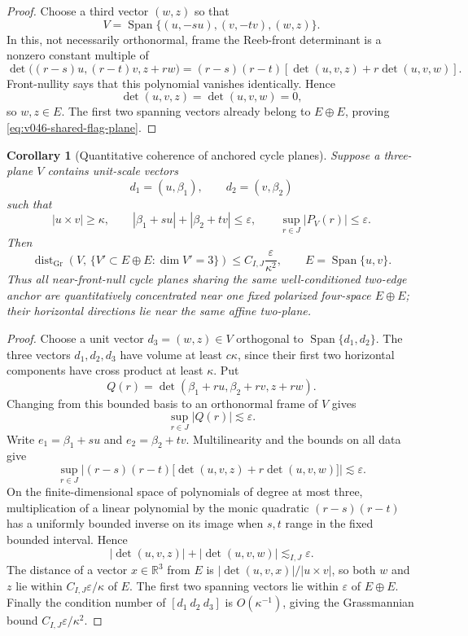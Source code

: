 \documentclass[10pt]{article}
\newtheorem{corollary}[theorem]{Corollary}
\newcommand{\R}{\mathbb R}
\newcommand{\Span}{\operatorname{Span}}
\begin{document}
\begin{proof}
Choose a third vector \((w,z)\) so that
\[
V=\Span\{(u,-su),(v,-tv),(w,z)\}.
\]
In this, not necessarily orthonormal, frame the Reeb-front determinant is a nonzero constant
multiple of
\[
\det\bigl((r-s)u,(r-t)v,z+rw\bigr)
=
(r-s)(r-t)
\left[
\det(u,v,z)+r\det(u,v,w)
\right].
\]
Front-nullity says that this polynomial vanishes identically.  Hence
\[
\det(u,v,z)=\det(u,v,w)=0,
\]
so \(w,z\in E\).  The first two spanning vectors already belong to \(E\oplus E\), proving
\eqref{eq:v046-shared-flag-plane}.
\end{proof}

\begin{corollary}[Quantitative coherence of anchored cycle planes]
\label{cor:v046-anchored-plane-coherence}
Suppose a three-plane \(V\) contains unit-scale vectors
\[
d_1=(u,\beta_1),
\qquad
d_2=(v,\beta_2)
\]
such that
\[
|u\times v|\ge\kappa,
\qquad
|\beta_1+su|+|\beta_2+tv|\le\varepsilon,
\qquad
\sup_{r\in J}|P_V(r)|\le\varepsilon.
\]
Then
\begin{equation}
\label{eq:v046-anchored-plane-coherence}
\boxed{
\operatorname{dist}_{\mathrm{Gr}}
\left(
V,\,
\{V'\subset E\oplus E:\dim V'=3\}
\right)
\le
C_{I,J}\frac{\varepsilon}{\kappa^2},
\qquad
E=\Span\{u,v\}.
}
\end{equation}
Thus all near-front-null cycle planes sharing the same well-conditioned two-edge anchor are
quantitatively concentrated near one fixed polarized four-space \(E\oplus E\); their horizontal
directions lie near the same affine two-plane.
\end{corollary}

\begin{proof}
Choose a unit vector \(d_3=(w,z)\in V\) orthogonal to \(\Span\{d_1,d_2\}\).  The three vectors
\(d_1,d_2,d_3\) have volume at least \(c\kappa\), since their first two horizontal components have
cross product at least \(\kappa\).  Put
\[
Q(r)
=
\det(\beta_1+ru,\beta_2+rv,z+rw).
\]
Changing from this bounded basis to an orthonormal frame of \(V\) gives
\[
\sup_{r\in J}|Q(r)|\lesssim\varepsilon.
\]
Write \(e_1=\beta_1+su\) and \(e_2=\beta_2+tv\).  Multilinearity and the bounds on all data give
\[
\sup_{r\in J}
\left|
(r-s)(r-t)
\bigl[\det(u,v,z)+r\det(u,v,w)\bigr]
\right|
\lesssim
\varepsilon.
\]
On the finite-dimensional space of polynomials of degree at most three, multiplication of a linear
polynomial by the monic quadratic \((r-s)(r-t)\) has a uniformly bounded inverse on its image when
\(s,t\) range in the fixed bounded interval.   Hence
\[
|\det(u,v,z)|+|\det(u,v,w)|
\lesssim_{I,J}
\varepsilon.
\]
The distance of a vector \(x\in\R^3\) from \(E\) is
\(|\det(u,v,x)|/|u\times v|\), so both \(w\) and \(z\) lie within
\(C_{I,J}\varepsilon/\kappa\) of \(E\).  The first two spanning vectors lie within
\(\varepsilon\) of \(E\oplus E\).  Finally the condition number of
\([d_1\ d_2\ d_3]\) is \(O(\kappa^{-1})\), giving the Grassmannian bound
\(C_{I,J}\varepsilon/\kappa^2\).
\end{proof}
\end{document}
